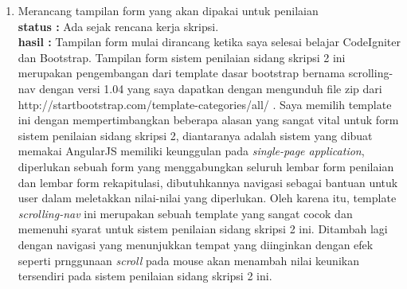 \documentclass[a4paper,twoside]{article}
\begin{document}
\begin{enumerate}
		\item Merancang tampilan form yang akan dipakai untuk penilaian\\
		{\bf status :} Ada sejak rencana kerja skripsi.\\
		{\bf hasil :} Tampilan form mulai dirancang ketika saya selesai belajar CodeIgniter dan Bootstrap. Tampilan form sistem penilaian sidang skripsi 2 ini merupakan pengembangan dari template dasar bootstrap bernama scrolling-nav dengan versi 1.04 yang saya dapatkan dengan mengunduh file zip dari http://startbootstrap.com/template-categories/all/ . Saya memilih template ini dengan mempertimbangkan beberapa alasan yang sangat vital untuk form sistem penilaian sidang skripsi 2, diantaranya adalah sistem yang dibuat memakai AngularJS memiliki keunggulan pada \textit{single-page application}, diperlukan sebuah form yang menggabungkan seluruh lembar form penilaian dan lembar form rekapitulasi, dibutuhkannya navigasi sebagai bantuan untuk user dalam meletakkan nilai-nilai yang diperlukan. Oleh karena itu, template \textit{scrolling-nav} ini merupakan sebuah template yang sangat cocok dan memenuhi syarat untuk sistem penilaian sidang skripsi 2 ini. Ditambah lagi dengan navigasi yang menunjukkan tempat yang diinginkan dengan efek seperti prnggunaan \textit{scroll} pada mouse akan menambah nilai keunikan tersendiri pada sistem penilaian sidang skripsi 2 ini.


\end{enumerate}
\end{document}
